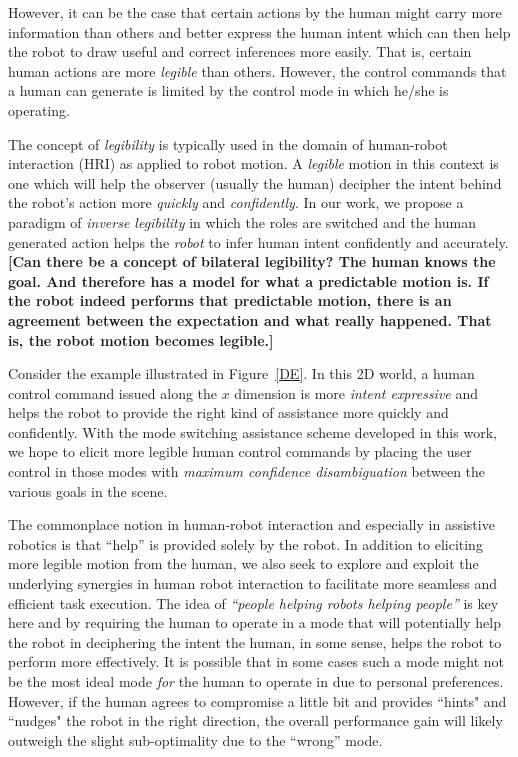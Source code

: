\documentclass[conference]{IEEEtran}
\begin{document}
However, it can be the case that certain actions by the human might carry more information than others and better express the human intent which can then help the robot to draw useful and correct inferences more easily. That is, certain human actions are more \textit{legible} than others. However, the control commands that a human can generate is limited by the control mode in which he/she is operating. 

The concept of \textit{legibility} is typically used in the domain of human-robot interaction (HRI) as applied to robot motion. A \textit{legible} motion in this context is one which will help the observer (usually the human) decipher the intent behind the robot's action more \textit{quickly} and \textit{confidently}. In our work, we propose a paradigm of \textit{inverse legibility} in which the roles are switched and the human generated action helps the \textit{robot} to infer human intent confidently and accurately. \textbf{[Can there be a concept of bilateral legibility? The human knows the goal. And therefore has a model for what a predictable motion is. If the robot indeed performs that predictable motion, there is an agreement between the expectation and what really happened. That is, the robot motion becomes legible.]}

Consider the example illustrated in Figure~\ref{DE}. In this 2D world, a human control command issued along the $x$ dimension is more \textit{intent expressive} and helps the robot to provide the right kind of assistance more quickly and confidently. With the mode switching assistance scheme developed in this work, we hope to elicit more legible human control commands by placing the user control in those modes with \textit{maximum confidence disambiguation} between the various goals in the scene. 

The commonplace notion in human-robot interaction and especially in assistive robotics is that ``help'' is provided solely by the robot. In addition to eliciting more legible motion from the human, we also seek to explore and exploit the underlying synergies in human robot interaction to facilitate more seamless and efficient task execution. The idea of \textit{``people helping robots helping people''} is key here and by requiring the human to operate in a mode that will potentially help the robot in deciphering the intent the human, in some sense, helps the robot to perform more effectively.
It is possible that in some cases such a mode might not be the most ideal mode \textit{for} the human to operate in due to personal preferences. However, if the human agrees to compromise a little bit and provides ``hints" and ``nudges" the robot in the right direction, the overall performance gain will likely outweigh the slight sub-optimality due to the ``wrong'' mode. 
\end{document}
